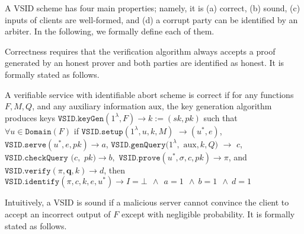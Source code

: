 A VSID scheme  has four main properties; namely, it is (a) correct, (b) sound, (c)  inputs of clients are well-formed, and (d) a corrupt party can be identified by an arbiter. In the following, we formally define each of them. 

Correctness requires that  the verification algorithm always accepts a proof generated by an honest prover and both parties are identified as honest.  It is formally stated as follows.

\begin{definition} A verifiable service with identifiable abort scheme  is  correct   if for any functions $F,M,Q$, and any auxiliary information $\text{aux}$, the key generation algorithm produces keys $\mathtt{VSID.keyGen}(1^{\lambda},F)\rightarrow k:=(sk,pk)$ such that $\forall u \in \mathtt{Domain}(F)$ if $\mathtt{VSID.setup}(1^{\lambda}, u,k,M)$ $\rightarrow (u^{\scriptscriptstyle *},e)$, $\mathtt{VSID.serve}(u^{\scriptscriptstyle *},e,pk)\rightarrow a$, $\mathtt{VSID.genQuery}(1^{\lambda}, $ $ \text{aux},k,Q)$ $ \rightarrow$ $ c$, $\mathtt{VSID.checkQuery}$ $(c, $ $pk)\rightarrow b,$  $\mathtt{VSID.prove}(u^{\scriptscriptstyle *},\sigma,c,pk)\rightarrow \pi$, and \\$\mathtt{VSID.verify}(\pi,\bm{q},k)\rightarrow d$, then  $\mathtt{VSID.identify}(\pi,c,k,e,u^{\scriptscriptstyle *})\rightarrow I=\bot \  \  \wedge \ \ a=1 \ \ \wedge \  b=1 \ \ \wedge \  d=1$
\end{definition}



Intuitively, a VSID is sound  if a malicious server cannot convince the client to accept an incorrect output of $F$ except with negligible probability. %
It is  formally stated as follows.

